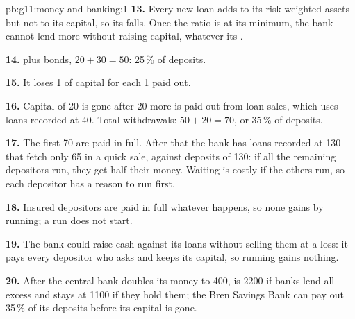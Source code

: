 \begin{solution}{pb:g11:money-and-banking:1}
\textbf{13.} Every new loan adds to its risk-weighted assets but not to its capital, so its  falls. Once the ratio is at its minimum, the bank cannot lend more
without raising capital, whatever its .

\textbf{14.}  plus bonds, $20 + 30 = 50$: 25\,\% of deposits.

\textbf{15.} It loses 1 of capital for each 1 paid out.

\textbf{16.} Capital of 20 is gone after 20 more is paid out from loan sales, which uses loans recorded at 40. Total withdrawals: $50 + 20 = 70$, or 35\,\% of deposits.

\textbf{17.} The first 70 are paid in full. After that the bank has loans recorded at 130 that fetch only 65 in a quick sale, against deposits of 130: if all the remaining
depositors run, they get half their money. Waiting is costly if the others run, so each depositor has a reason to run first.

\textbf{18.} Insured depositors are paid in full whatever happens, so none gains by running; a run does not start.

\textbf{19.} The bank could raise cash against its loans without selling them at a loss: it pays every depositor who asks and keeps its capital, so running gains nothing.

\textbf{20.} After the central bank doubles its money to 400,  is 2200 if banks lend all excess  and stays at 1100 if they hold them; the Bren Savings
Bank can pay out 35\,\% of its deposits before its capital is gone.
\end{solution}

